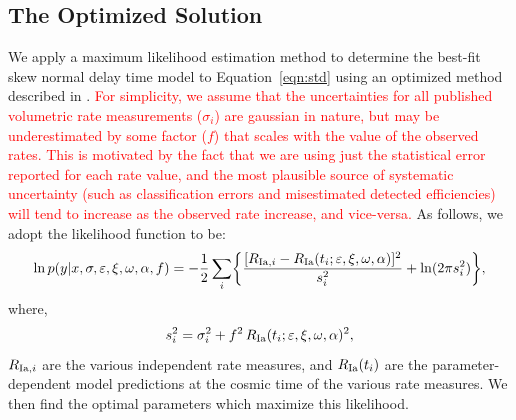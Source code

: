 \documentclass[apj, linenumbers]{aastex62}
\begin{document}
\subsection{The Optimized Solution\label{sec:optimized_soln}}
We apply a maximum likelihood estimation method to determine the best-fit skew normal delay time model to Equation~\ref{eqn:std} using an optimized method described in \cite{Hogg:2010fj}. \textcolor{red}{For simplicity, we assume that the uncertainties for all published volumetric rate measurements ($\sigma_i$) are gaussian in nature, but may be underestimated by some factor ($f$) that scales with the value of the observed rates. This is motivated by the fact that we are using just the statistical error reported for each rate value, and the most plausible source of systematic uncertainty (such as classification errors and misestimated detected efficiencies) will tend to increase as the observed rate increase, and vice-versa.} As follows, we adopt the likelihood function to be:
\begin{equation}
\ln p(y|x, \sigma, \varepsilon, \xi, \omega, \alpha, f) = -\frac{1}{2} \sum_i \biggl\{ \frac{[R_{{\rm Ia},i} - R_{\rm Ia}(t_i; \varepsilon, \xi, \omega, \alpha)]^2}{s_i^2}+\ln (2\pi s_i^2)\biggr\},
	\label{eqn:lf}
\end{equation}
where,
\begin{equation}
s_i^2 = \sigma_i^2+f^2\, R_{\rm Ia}(t_i; \varepsilon, \xi, \omega, \alpha)^2,
\end{equation}
\noindent $R_{{\rm Ia},i}$ are the various independent rate measures, and $R_{\rm Ia}(t_i)$ are the parameter-dependent model predictions at the cosmic time of the various rate measures. We then find the optimal parameters which maximize this likelihood. 

\end{document}
